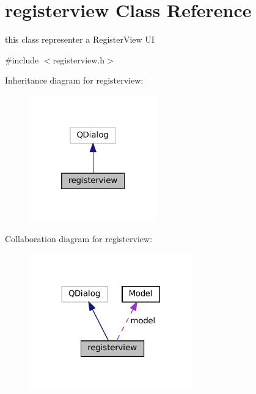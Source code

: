 \hypertarget{classregisterview}{}\section{registerview Class Reference}
\label{classregisterview}


this class representer a Register\+View UI  




{\ttfamily \#include $<$registerview.\+h$>$}



Inheritance diagram for registerview\+:\nopagebreak
\begin{figure}[H]
\begin{center}
\leavevmode
\includegraphics[width=157pt]{classregisterview__inherit__graph}
\end{center}
\end{figure}


Collaboration diagram for registerview\+:\nopagebreak
\begin{figure}[H]
\begin{center}
\leavevmode
\includegraphics[width=200pt]{classregisterview__coll__graph}
\end{center}
\end{figure}
